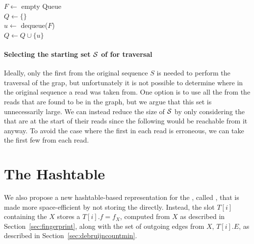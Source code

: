 \begin{algorithm}
	\caption{$C.\mathit{traverse}(\strsetname{S}, t)$}\label{alg:traversal}
  $F \gets$ empty Queue\\
  $Q \gets \{\}$\\
   {
    $u \gets$ dequeue($F$)\\
    $Q \gets Q \cup \{u\}$\\
  }
\end{algorithm}

\paragraph*{Selecting the starting set $\strsetname{S}$ of  for traversal} Ideally, only the first \kmer from the original sequence $S$ is needed to perform the traversal of the grap, but unfortunately it is not possible to determine where in the original sequence a read was taken from. One option is to use all the  from the reads that are found to be in the graph, but we argue that this set is unnecessarily large. We can instead reduce the size of $\strsetname{S}$ by only considering the  that are at the start of their reads since the following \kmers would be reachable from it anyway. To avoid the case where the first \kmer in each read is erroneous, we can take the first few  from each read. 

\section{The \dB Hashtable}
\label{sec:debruijnhashtable}

We also propose a new hashtable-based representation for the \dBG, called  \dBHT, that is made more space-efficient by not storing the \kmer directly. Instead, the slot $T[i]$ containing the \kmer $X$ stores a  $T[i].f = f_X$, computed from $X$ as described in Section~\ref{sec:fingerprint}, along with the set of outgoing edges from $X$, $T[i].E$,  as described in Section~\ref{sec:debruijncountmin}.

